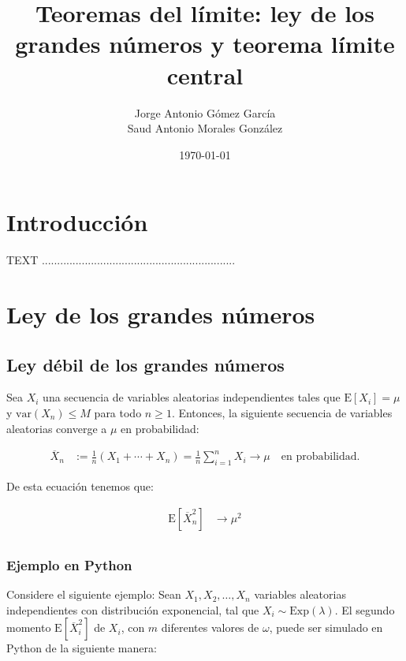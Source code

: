 \documentclass[8pt]{article}
\title{Teoremas del límite: ley de los grandes números y teorema límite central}
\author{Jorge Antonio Gómez García \\ Saud Antonio Morales González}
\date{\today}
\begin{document}
\maketitle
\tableofcontents
\pagebreak




\section{Introducción}
TEXT ...............................................................



\section{Ley de los grandes números}


\subsection{Ley débil de los grandes números}

Sea $X_i$ una secuencia de variables aleatorias independientes tales que $\text{E}[X_i] = \mu$ y $\text{var}(X_n) \leq M$ para todo $n \geq 1$. Entonces, la siguiente secuencia de variables aleatorias converge a $\mu$ en probabilidad:

\begin{align*}
    \overline{X}_n &:= \frac{1}{n}(X_1 + \cdots + X_n) = \frac{1}{n}\sum_{i=1}^n X_i \longrightarrow \mu \quad \text{en probabilidad}.
\end{align*}

De esta ecuación tenemos que:

\begin{align*}
    \text{E}[\overline{X}^2_n] &\rightarrow \mu^2 \\
\end{align*}

\subsubsection{Ejemplo en Python}

Considere el siguiente ejemplo: Sean $X_1, X_2, \ldots, X_n$ variables aleatorias independientes con distribución exponencial, tal que $X_i \sim \text{Exp}(\lambda)$. El segundo momento $\text{E}[\overline{X}^2_i]$ de $X_i$, con $m$ diferentes valores de $\omega$, puede ser simulado en Python de la siguiente manera:
\end{document}

